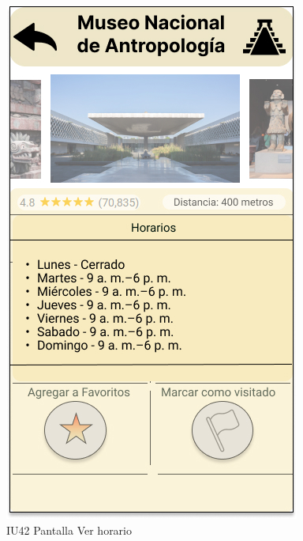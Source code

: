 \begin{figure}[h]
    \begin{minipage}{0.5\textwidth}
        \centering
        \includegraphics[width=.7\linewidth]{Pantallas Prototipo3/IU42-Ver horario.jpg}
        \caption{IU42 Pantalla Ver horario}
    \end{minipage}%
\end{figure}

